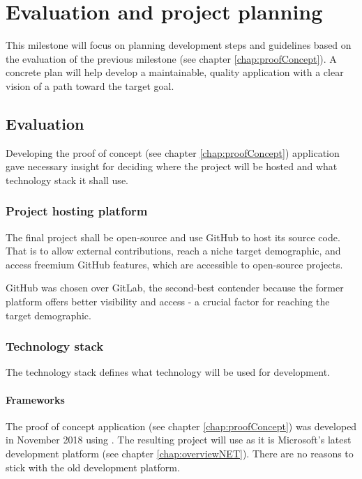 \chapter{Evaluation and project planning} \label{chap:evalProjPlan}

This milestone will focus on planning development steps and guidelines based on the evaluation of the previous milestone (see chapter \ref{chap:proofConcept}).
A concrete plan will help develop a maintainable, quality application with a clear vision of a path toward the target goal.

\section{Evaluation}

Developing the proof of concept (see chapter \ref{chap:proofConcept}) application gave necessary insight for deciding where the project will be hosted and what technology stack it shall use.


\subsection{Project hosting platform}

The final project shall be open-source and use GitHub to host its source code.
That is to allow external contributions, reach a niche target demographic, and access freemium GitHub features, which are accessible to open-source projects.

GitHub was chosen over GitLab, the second-best contender because the former platform offers better visibility and access - a crucial factor for reaching the target demographic.

\subsection{Technology stack}

The technology stack defines what technology will be used for development.

\subsubsection{Frameworks}

The proof of concept application (see chapter \ref{chap:proofConcept}) was developed in November 2018 using . The resulting project will use  as it is Microsoft's latest development platform (see chapter \ref{chap:overviewNET}). There are no reasons to stick with the old development platform.

